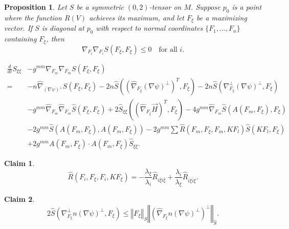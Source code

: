 \documentclass[10pt,a4paper]{amsart}
\newtheorem{proposition}{Proposition}
\newtheorem{claim}{Claim}
\newcommand{\maxidx}{\mathord{\xi}} %
\begin{document}
\begin{proposition}
\label{p1}
Let $S$ be a symmetric $(0,2)$-tensor on $M$. 
Suppose $p_0$ is a point where the function $R(V)$ achieves its maximum, 
and let $F_{\maxidx}$ be a maximizing vector. 
If $S$ is diagonal at $p_0$ with respect to normal coordinates 
$\{F_1,\ldots,F_n\}$ containing $F_{\maxidx}$, then
\[
\nabla_{F_i}\nabla_{F_i} S(F_{\maxidx},F_{\maxidx}) \le 0
\quad \text{for all } i .
\]
\end{proposition}

\begin{align}
\frac{d}{dt}S_{\maxidx\maxidx}
& - g^{mm}\nabla_{F_{m}}\nabla_{F_{m}}S(F_{\maxidx},F_{\maxidx})  \label{evolution S}\\
=& -n\hat{\nabla}_{\left( \nabla \psi \right) ^{\perp }}S(F_{\maxidx},F_{\maxidx})
   -2n\hat{S}\left( (\hat{\nabla}_{F_{\maxidx}}\left( \nabla \psi \right) ^{\perp })^{T},
     F_{\maxidx}\right)
   -2n\hat{S}\left( \nabla_{F_{\maxidx}}^{\perp }\left( \nabla \psi \right) ^{\perp },
     F_{\maxidx}\right) \nonumber \\
& - g^{mm}\hat{\nabla}_{F_{m}}\hat{\nabla}_{F_{m}}\hat{S}(F_{\maxidx},F_{\maxidx})
  + 2\hat{S}_{\maxidx\maxidx}\left( (\hat{\nabla}_{F_{\maxidx}}\vec{H})^{T}, F_{\maxidx}\right)
  - 4 g^{mm}\hat{\nabla}_{F_{m}}\hat{S}(A(F_{m},F_{\maxidx}),F_{\maxidx}) \nonumber \\
& - 2 g^{mm}\hat{S}(A(F_{m},F_{\maxidx}),A(F_{m},F_{\maxidx}))
  - 2 g^{mm}\sum \hat{R}(F_{m},F_{\maxidx},F_{m},KF_{l})\hat{S}(KF_{l},F_{\maxidx}) \nonumber \\
& + 2 g^{mm}A(F_{m},F_{\maxidx}) \cdot A(F_{m},F_{\maxidx}) \hat{S}_{\maxidx\maxidx}. \nonumber
\end{align}

\begin{claim}\label{a67}
\begin{equation*}
\hat{R}(F_{i},F_{\maxidx},F_{i},KF_{\maxidx})
= -\frac{\lambda_{\maxidx}}{\lambda_{i}} \hat{R}_{i\overline{\maxidx} i\overline{\maxidx}}
  + \frac{\lambda_{i}}{\lambda_{\maxidx}} \hat{R}_{\overline{i} \maxidx \overline{i} \maxidx}.
\end{equation*}
\end{claim}

\begin{claim} \label{annoying}%
\[
2\hat{S}\left(  \nabla_{F_{\maxidx}}^{\perp}n\left(  \nabla\psi\right)  ^{\perp}
,F_{\maxidx}\right)  \leq\left\Vert F_{\maxidx}\right\Vert _{S}\left\Vert \left(
\hat{\nabla}_{F_{\maxidx}}n\left(  \nabla\psi\right)  ^{\perp}\right)  ^{\perp}
\right\Vert _{\hat{S}}.
\]
\end{claim}
\end{document}
